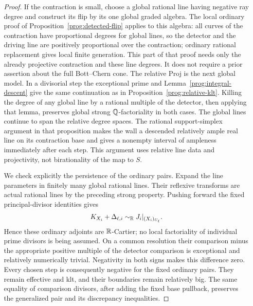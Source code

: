 \begin{proof}
If the contraction is small, choose a global rational line having
negative ray degree and construct its flip by its one global
graded algebra. The local ordinary proof of
Proposition~\ref{prog:detected-flip} applies to this algebra:
all curves of the contraction have proportional degrees for global
lines, so the detector and the driving line are positively
proportional over the contraction; ordinary rational replacement
gives local finite generation. This part of that proof needs only
the already projective contraction and these line degrees.
It does not require a prior assertion about the full Bott--Chern
cone. The relative Proj is the next global model. In a divisorial
step the exceptional prime and
Lemma~\ref{prog:integral-descent} give the same continuation as in
Proposition~\ref{prog:relative-klt}. Killing the degree of any global
line by a rational multiple of the detector, then applying that
lemma, preserves global strong \(\mathbb Q\)-factoriality in both cases.
The global lines continue to span the relative degree spaces.
The rational support-simplex argument in that proposition makes
the wall a descended relatively ample real line on its contraction
base and gives a nonempty interval of ampleness immediately after
each step. This argument uses relative line data and projectivity,
not birationality of the map to \(S\).

We check explicitly the persistence of the ordinary pairs. Expand
the line parameters in finitely many global rational lines. Their
reflexive transforms are actual rational lines by the preceding
strong property. Pushing forward the fixed principal-divisor
identities gives
\[
 K_{X_i}+\Delta_{\ell,i}\sim_{\mathbb R}J_i|_{(X_i)_{U_\ell}}.
\]
Hence these ordinary adjoints are \(\mathbb R\)-Cartier; no local
factoriality of individual prime divisors is being assumed.
On a common resolution their comparison minus the appropriate
positive multiple of the detector comparison is exceptional and
relatively numerically trivial. Negativity in both signs makes
this difference zero. Every chosen step is consequently negative
for the fixed ordinary pairs. They remain effective and klt, and
their boundaries remain relatively big. The same equality of
comparison divisors, after adding the fixed base pullback,
preserves the generalized pair and its discrepancy inequalities.


\end{proof}
